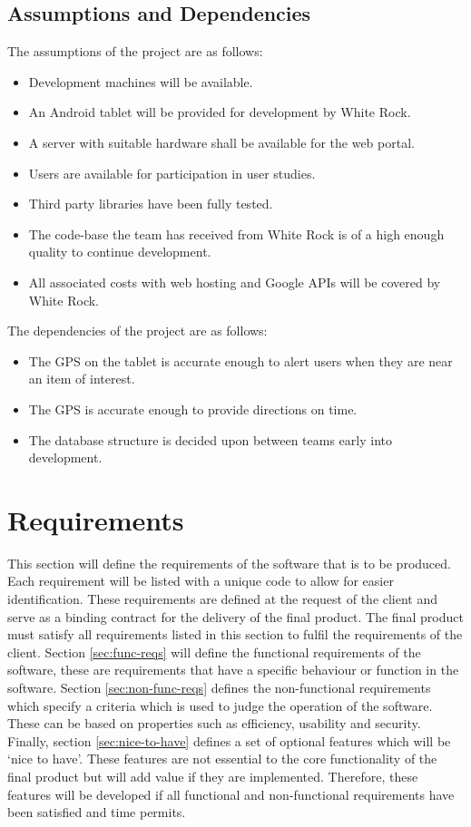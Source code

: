\documentclass[11pt,a4paper]{article}
\begin{document}
\subsection{Assumptions and Dependencies}
\label{sec:assumptions-dependencies}
The assumptions of the project are as follows:

\begin{itemize}
\item Development machines will be available.
\item An Android tablet will be provided for development by White Rock.
\item A server with suitable hardware shall be available for the web portal.
\item Users are available for participation in user studies.
\item Third party libraries have been fully tested.
\item The code-base the team has received from White Rock is of a high enough quality to continue development.
\item All associated costs with web hosting and Google APIs will be covered by White Rock.
\end{itemize}

The dependencies of the project are as follows:
\begin{itemize}
\item The GPS on the tablet is accurate enough to alert users when they are near an item of interest.
\item The GPS is accurate enough to provide directions on time.
\item The database structure is decided upon between teams early into development.
\end{itemize}

\section{Requirements}
\label{sec:requirements}

This section will define the requirements of the software that is to be produced.
Each requirement will be listed with a unique code to allow for easier identification.
These requirements are defined at the request of the client and serve as a binding contract for the delivery of the final product.
The final product must satisfy all requirements listed in this section to fulfil the requirements of the client.
Section \ref{sec:func-reqs} will define the functional requirements of the software, these are requirements that have a specific behaviour or function in the software. 
Section \ref{sec:non-func-reqs} defines the non-functional requirements which specify a criteria which is used to judge the operation of the software.
These can be based on properties such as efficiency, usability and security.
Finally, section \ref{sec:nice-to-have} defines a set of optional features which will be `nice to have'.
These features are not essential to the core functionality of the final product but will add value if they are implemented.
Therefore, these features will be developed if all functional and non-functional requirements have been satisfied and time permits.
\end{document}
